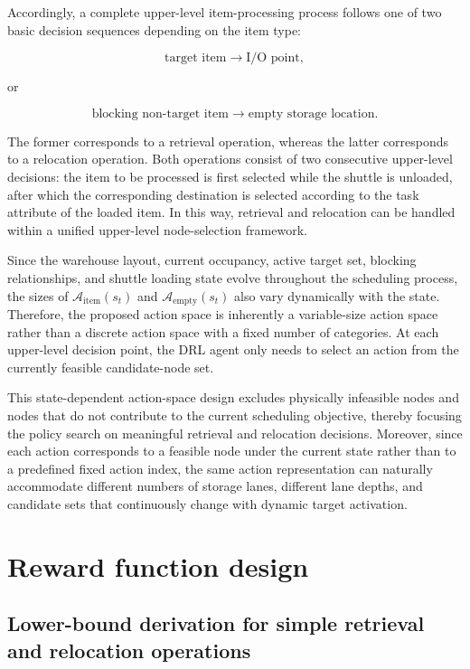 Accordingly, a complete upper-level item-processing process follows one of two basic decision sequences depending on the item type:

\[
\text{target item}
\rightarrow
\text{I/O point},
\]

or

\[
\text{blocking non-target item}
\rightarrow
\text{empty storage location}.
\]

The former corresponds to a retrieval operation, whereas the latter corresponds to a relocation operation. Both operations consist of two consecutive upper-level decisions: the item to be processed is first selected while the shuttle is unloaded, after which the corresponding destination is selected according to the task attribute of the loaded item. In this way, retrieval and relocation can be handled within a unified upper-level node-selection framework.

Since the warehouse layout, current occupancy, active target set, blocking relationships, and shuttle loading state evolve throughout the scheduling process, the sizes of $\mathcal{A}_{\mathrm{item}}(s_t)$ and $\mathcal{A}_{\mathrm{empty}}(s_t)$ also vary dynamically with the state. Therefore, the proposed action space is inherently a variable-size action space rather than a discrete action space with a fixed number of categories. At each upper-level decision point, the DRL agent only needs to select an action from the currently feasible candidate-node set.

This state-dependent action-space design excludes physically infeasible nodes and nodes that do not contribute to the current scheduling objective, thereby focusing the policy search on meaningful retrieval and relocation decisions. Moreover, since each action corresponds to a feasible node under the current state rather than to a predefined fixed action index, the same action representation can naturally accommodate different numbers of storage lanes, different lane depths, and candidate sets that continuously change with dynamic target activation.

\section{Reward function design}
\subsection{Lower-bound derivation for simple retrieval and relocation operations}

